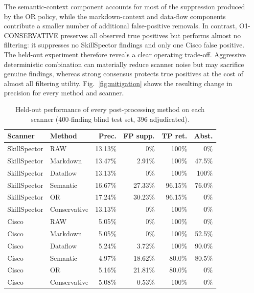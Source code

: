 \documentclass[conference]{IEEEtran}
\begin{document}
The semantic-context component accounts for most of the suppression produced by the OR policy, while the markdown-context and data-flow components contribute a smaller number of additional false-positive removals. In contrast, O1-CONSERVATIVE preserves all observed true positives but performs almost no filtering: it suppresses no SkillSpector findings and only one Cisco false positive. The held-out experiment therefore reveals a clear operating trade-off. Aggressive deterministic combination can materially reduce scanner noise but may sacrifice genuine findings, whereas strong consensus protects true positives at the cost of almost all filtering utility. Fig.~\ref{fig:mitigation} shows the resulting change in precision for every method and scanner.

\begin{table}[t]
\caption{Held-out performance of every post-processing method on each scanner (400-finding blind test set, 396 adjudicated).}
\label{tab:heldout}
\centering\footnotesize
\setlength{\tabcolsep}{3.5pt}
\begin{tabular}{@{}llrrrr@{}}
\toprule
\textbf{Scanner} & \textbf{Method} & \textbf{Prec.} & \textbf{FP supp.} & \textbf{TP ret.} & \textbf{Abst.} \\
\midrule
SkillSpector & RAW & 13.13\% & 0\% & 100\% & 0\% \\
SkillSpector & Markdown & 13.47\% & 2.91\% & 100\% & 47.5\% \\
SkillSpector & Dataflow & 13.13\% & 0\% & 100\% & 100\% \\
SkillSpector & Semantic & 16.67\% & 27.33\% & 96.15\% & 76.0\% \\
SkillSpector & OR & 17.24\% & 30.23\% & 96.15\% & 0\% \\
SkillSpector & Conservative & 13.13\% & 0\% & 100\% & 0\% \\
\midrule
Cisco & RAW & 5.05\% & 0\% & 100\% & 0\% \\
Cisco & Markdown & 5.05\% & 0\% & 100\% & 52.5\% \\
Cisco & Dataflow & 5.24\% & 3.72\% & 100\% & 90.0\% \\
Cisco & Semantic & 4.97\% & 18.62\% & 80.0\% & 80.5\% \\
Cisco & OR & 5.16\% & 21.81\% & 80.0\% & 0\% \\
Cisco & Conservative & 5.08\% & 0.53\% & 100\% & 0\% \\
\bottomrule
\end{tabular}
\end{table}
\end{document}
